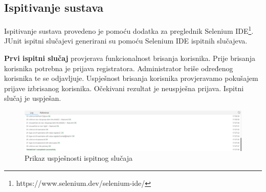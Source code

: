 			\newpage
			
			\subsection{Ispitivanje sustava}
		 	
		 	Ispitivanje sustava provedeno je pomoću dodatka za preglednik Selenium IDE\footnote{https://www.selenium.dev/selenium-ide/}. JUnit ispitni slučajevi generirani su pomoću Selenium IDE ispitnih slučajeva.
		 	
		 	\textbf{Prvi ispitni slučaj} provjerava funkcionalnost brisanja korisnika. Prije brisanja korisnika potrebna je prijava registratora. Administrator briše određenog korisnika te se odjavljuje. Uspješnost brisanja korisnika provjeravamo pokušajem prijave izbrisanog korisnika. Očekivani rezultat je neuspješna prijava. Ispitni slučaj je uspješan.
		 	
		 	\begin{figure} [hbt!]
		 		\includegraphics[width=\linewidth]{Slike/deleteUser}
		 		\caption{Prikaz uspješnosti ispitnog slučaja}
		 	\end{figure}
		 	
